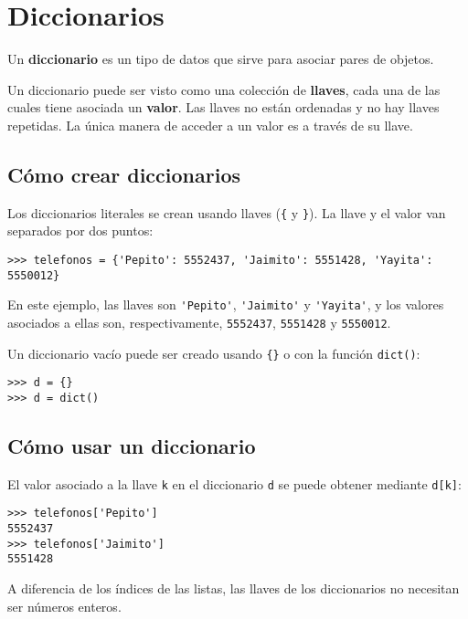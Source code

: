 \section{Diccionarios}

Un \textbf{diccionario} es un tipo de datos que sirve para asociar pares
de objetos.

Un diccionario puede ser visto como una colección de \textbf{llaves},
cada una de las cuales tiene asociada un \textbf{valor}. Las llaves no
están ordenadas y no hay llaves repetidas. La única manera de acceder a
un valor es a través de su llave.

\subsection{Cómo crear diccionarios}

Los diccionarios literales se crean usando llaves (\lstinline!{! y
\lstinline!}!). La llave y el valor van separados por dos puntos:

\begin{lstlisting}
>>> telefonos = {'Pepito': 5552437, 'Jaimito': 5551428, 'Yayita': 5550012}
\end{lstlisting}

En este ejemplo, las llaves son \lstinline!'Pepito'!,
\lstinline!'Jaimito'! y \lstinline!'Yayita'!, y los valores asociados a
ellas son, respectivamente, \lstinline!5552437!, \lstinline!5551428! y
\lstinline!5550012!.

Un diccionario vacío puede ser creado usando \lstinline!{}! o con la
función \lstinline!dict()!:

\begin{lstlisting}
>>> d = {}
>>> d = dict()
\end{lstlisting}

\subsection{Cómo usar un diccionario}

El valor asociado a la llave \lstinline!k! en el diccionario
\lstinline!d! se puede obtener mediante \lstinline!d[k]!:

\begin{lstlisting}
>>> telefonos['Pepito']
5552437
>>> telefonos['Jaimito']
5551428
\end{lstlisting}

A diferencia de los índices de las listas, las llaves de los
diccionarios no necesitan ser números enteros.

